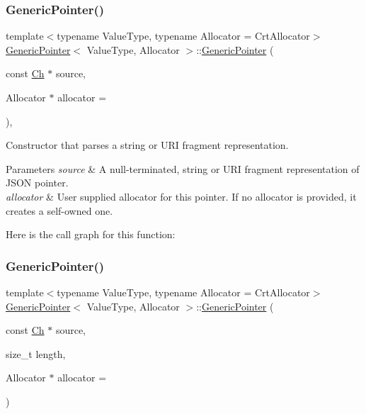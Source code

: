 \subsubsection{\texorpdfstring{Generic\+Pointer()}{GenericPointer()}\hspace{0.1cm}{\footnotesize\ttfamily [1/3]}}
{\footnotesize\ttfamily template$<$typename Value\+Type, typename Allocator = Crt\+Allocator$>$ \\
\hyperlink{class_generic_pointer}{Generic\+Pointer}$<$ Value\+Type, Allocator $>$\+::\hyperlink{class_generic_pointer}{Generic\+Pointer} (\begin{DoxyParamCaption}\item[{const \hyperlink{class_generic_pointer_ab292356c11b4015c98d21b966b11f285}{Ch} $\ast$}]{source,  }\item[{Allocator $\ast$}]{allocator = {} }\end{DoxyParamCaption})\hspace{0.3cm}{\ttfamily [inline]}, {\ttfamily [explicit]}}



Constructor that parses a string or U\+RI fragment representation. 


\begin{DoxyParams}{Parameters}
{\em source} & A null-\/terminated, string or U\+RI fragment representation of J\+S\+ON pointer. \\
\hline
{\em allocator} & User supplied allocator for this pointer. If no allocator is provided, it creates a self-\/owned one. \\
\hline
\end{DoxyParams}
Here is the call graph for this function\+:
\mbox{\label{class_generic_pointer_a9c05684ea95306aac7626e70cb3946cc}} 
\subsubsection{\texorpdfstring{Generic\+Pointer()}{GenericPointer()}\hspace{0.1cm}{\footnotesize\ttfamily [2/3]}}
{\footnotesize\ttfamily template$<$typename Value\+Type, typename Allocator = Crt\+Allocator$>$ \\
\hyperlink{class_generic_pointer}{Generic\+Pointer}$<$ Value\+Type, Allocator $>$\+::\hyperlink{class_generic_pointer}{Generic\+Pointer} (\begin{DoxyParamCaption}\item[{const \hyperlink{class_generic_pointer_ab292356c11b4015c98d21b966b11f285}{Ch} $\ast$}]{source,  }\item[{size\+\_\+t}]{length,  }\item[{Allocator $\ast$}]{allocator = {} }\end{DoxyParamCaption})\hspace{0.3cm}{\ttfamily [inline]}}




